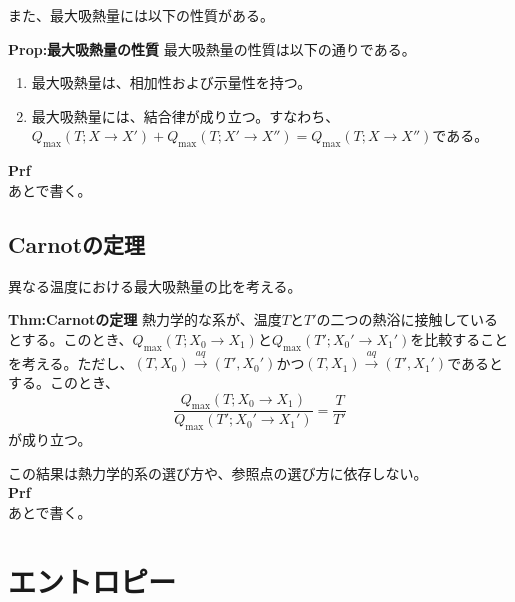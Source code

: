 \documentclass[a4paper,11pt]{jsarticle}
\begin{document}
また、最大吸熱量には以下の性質がある。\\
\begin{itembox}[l]{\textbf{Prop:最大吸熱量の性質}}
    最大吸熱量の性質は以下の通りである。
    \begin{enumerate}
        \item 最大吸熱量は、相加性および示量性を持つ。
        \item 最大吸熱量には、結合律が成り立つ。すなわち、$Q_{\text{max}}(T;X\rightarrow X')+Q_{\text{max}}(T;X'\rightarrow X'') = Q_{\text{max}}(T;X\rightarrow X'')$である。
    \end{enumerate}
\end{itembox}
\textbf{Prf}\\
あとで書く。\\

\subsection{Carnotの定理}
異なる温度における最大吸熱量の比を考える。\\
\begin{itembox}[l]{\textbf{Thm:Carnotの定理}}
    熱力学的な系が、温度$T$と$T'$の二つの熱浴に接触しているとする。このとき、$Q_{\text{max}}(T;X_0\rightarrow X_1)$と$Q_{\text{max}}(T';X_0'\rightarrow X_1')$を比較することを考える。ただし、$(T,X_0)\xrightarrow{aq}(T',X_0')$かつ$(T,X_1)\xrightarrow{aq}(T',X_1')$であるとする。このとき、
    \begin{equation}
        \frac{Q_{\text{max}}(T;X_0\rightarrow X_1)}{Q_{\text{max}}(T';X_0'\rightarrow X_1')} = \frac{T}{T'} 
    \end{equation}
    が成り立つ。
\end{itembox} 
この結果は熱力学的系の選び方や、参照点の選び方に依存しない。\\
\textbf{Prf}\\
あとで書く。\\

\section{エントロピー}
\end{document}
